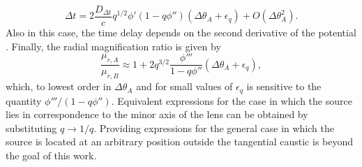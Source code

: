 \documentclass[usenatbib]{mnras}
\begin{document}
\begin{equation}\label{eq:ellpot_dt}
\Delta t = 2\frac{D_{\Delta t}}{c}q^{1/2}\phi'(1 - q\phi'')(\Delta\theta_A + \epsilon_q) + O(\Delta\theta_A^2).
\end{equation}
Also in this case, the time delay depends on the second derivative of the potential \citep[see also][]{Koc02}.
Finally, the radial magnification ratio is given by
\begin{equation}\label{eq:ellpot_radmagrat}
\frac{\mu_{r,A}}{\mu_{r,B}} \approx 1 + 2q^{3/2}\frac{\phi'''}{1-q\phi''}(\Delta\theta_A + \epsilon_q),
\end{equation}
which, to lowest order in $\Delta\theta_A$ and for small values of $\epsilon_q$ is sensitive to the quantity $\phi'''/(1-q\phi'')$.
Equivalent expressions for the case in which the source lies in correspondence to the minor axis of the lens can be obtained by substituting $q \rightarrow 1/q$.
Providing expressions for the general case in which the source is located at an arbitrary position outside the tangential caustic is beyond the goal of this work.
\end{document}
